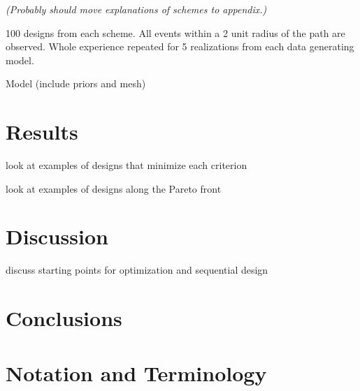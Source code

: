 \documentclass[review]{elsarticle}
\begin{document}
{\it (Probably should move explanations of schemes to appendix.)}

100 designs from each scheme. All events within a 2 unit radius of the path are
observed. Whole experience repeated for 5 realizations from each data
generating model.

Model (include priors and mesh)




\section{Results}

look at examples of designs that minimize each criterion

look at examples of designs along the Pareto front


\section{Discussion}

discuss starting points for optimization and sequential design


\section{Conclusions}


\appendix
\section{Notation and Terminology}
\end{document}
